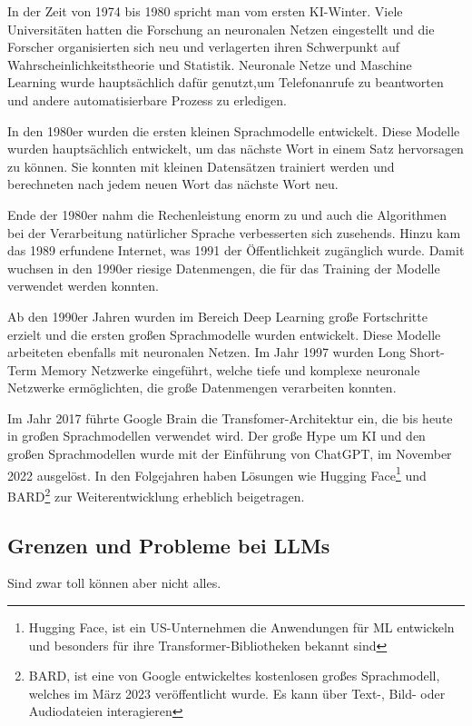 In der Zeit von 1974 bis 1980 spricht man vom \glqq ersten KI-Winter\grqq . Viele Universitäten hatten die Forschung an neuronalen Netzen eingestellt und die Forscher organisierten sich neu und verlagerten ihren Schwerpunkt auf Wahrscheinlichkeitstheorie und Statistik. Neuronale Netze und Maschine Learning wurde hauptsächlich dafür genutzt,um Telefonanrufe zu beantworten und andere automatisierbare Prozess zu erledigen.\vspace{0.2cm}

In den 1980er wurden die ersten kleinen Sprachmodelle entwickelt. Diese Modelle wurden hauptsächlich entwickelt, um das nächste Wort in einem Satz hervorsagen zu können. Sie konnten mit kleinen Datensätzen trainiert werden und berechneten nach jedem neuen Wort das nächste Wort neu.\vspace{0.2cm}

Ende der 1980er nahm die Rechenleistung enorm zu und auch die Algorithmen bei der Verarbeitung natürlicher Sprache verbesserten sich zusehends. Hinzu kam das 1989 erfundene Internet, was 1991 der Öffentlichkeit zugänglich wurde. Damit wuchsen in den 1990er riesige Datenmengen, die für das Training der Modelle verwendet werden konnten.\vspace{0.2cm}

Ab den 1990er Jahren wurden im Bereich Deep Learning große Fortschritte erzielt und die ersten großen Sprachmodelle wurden entwickelt. Diese Modelle arbeiteten ebenfalls mit neuronalen Netzen. Im Jahr 1997 wurden Long Short-Term Memory Netzwerke eingeführt, welche tiefe und komplexe neuronale Netzwerke ermöglichten, die große Datenmengen verarbeiten konnten.\vspace{0.2cm}

Im Jahr 2017 führte Google Brain die Transfomer-Architektur ein, die bis heute in großen Sprachmodellen verwendet wird. Der große Hype um KI und den großen Sprachmodellen wurde mit der Einführung von ChatGPT, im November 2022 ausgelöst. In den Folgejahren haben Lösungen wie Hugging Face\footnote{Hugging Face, ist ein US-Unternehmen die Anwendungen für ML entwickeln und besonders für ihre Transformer-Bibliotheken bekannt sind} und BARD\footnote{BARD, ist eine von Google entwickeltes kostenlosen großes Sprachmodell, welches im März 2023 veröffentlicht wurde. Es kann über Text-, Bild- oder Audiodateien interagieren} zur Weiterentwicklung erheblich beigetragen.


\subsection{Grenzen und Probleme bei LLMs}
Sind zwar toll können aber nicht alles.

